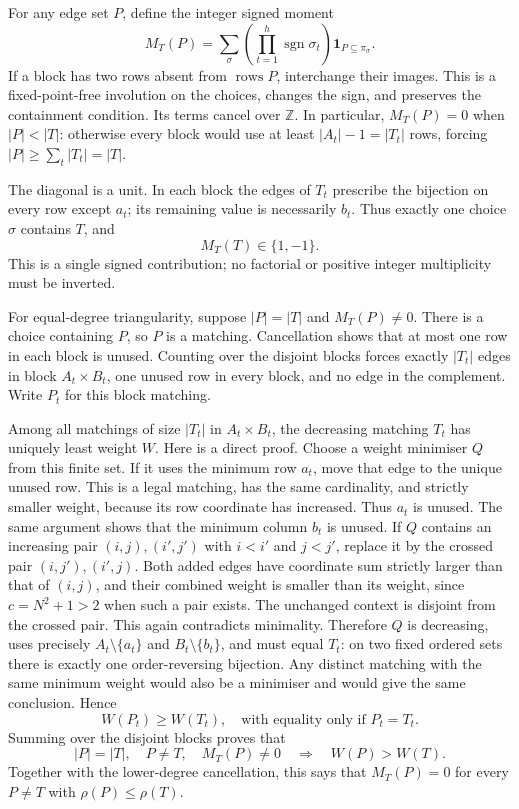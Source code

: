For any edge set $P$, define the integer signed moment
\[
 M_T(P)=\sum_{\sigma}
     \left(\prod_{t=1}^{h}\operatorname{sgn}\sigma_t\right)
     \boldsymbol{1}_{P\subseteq\pi_\sigma}.
\]
If a block has two rows absent from $\operatorname{rows}P$, interchange
their images.  This is a fixed-point-free involution on the choices,
changes the sign, and preserves the containment condition.  Its terms
cancel over $\mathbb Z$.  In particular, $M_T(P)=0$ when $|P|<|T|$:
otherwise every block would use at least $|A_t|-1=|T_t|$ rows, forcing
$|P|\geq\sum_t|T_t|=|T|$.

The diagonal is a unit.  In each block the edges of $T_t$ prescribe the
bijection on every row except $a_t$; its remaining value is necessarily
$b_t$.  Thus exactly one choice $\sigma$ contains $T$, and
\[
 M_T(T)\in\{1,-1\}.
\]
This is a single signed contribution; no factorial or positive integer
multiplicity must be inverted.

For equal-degree triangularity, suppose $|P|=|T|$ and $M_T(P)\ne0$.
There is a choice containing $P$, so $P$ is a matching.  Cancellation
shows that at most one row in each block is unused.  Counting over the
disjoint blocks forces exactly $|T_t|$ edges in block $A_t\times B_t$,
one unused row in every block, and no edge in the complement.  Write
$P_t$ for this block matching.

Among all matchings of size $|T_t|$ in $A_t\times B_t$, the decreasing
matching $T_t$ has uniquely least weight $W$.  Here is a direct proof.
Choose a weight minimiser $Q$ from this finite set.  If it uses the
minimum row $a_t$, move that edge to the unique unused row.  This is a
legal matching, has the same cardinality, and strictly smaller weight,
because its row coordinate has increased.  Thus $a_t$ is unused.
The same argument shows that the minimum column $b_t$ is unused.
If $Q$ contains an increasing pair $(i,j),(i',j')$ with
$i<i'$ and $j<j'$, replace it by the crossed pair
$(i,j'),(i',j)$.  Both added edges have coordinate sum strictly larger
than that of $(i,j)$, and their combined weight is smaller than its
weight, since $c=N^2+1>2$ when such a pair exists.  The unchanged context
is disjoint from the crossed pair.  This again contradicts minimality.
Therefore $Q$ is decreasing, uses precisely $A_t\setminus\{a_t\}$
and $B_t\setminus\{b_t\}$, and must equal $T_t$: on two fixed ordered
sets there is exactly one order-reversing bijection.  Any distinct
matching with the same minimum weight would also be a minimiser and
would give the same conclusion.  Hence
\[
 W(P_t)\geq W(T_t),\quad\text{with equality only if }P_t=T_t.
\]
Summing over the disjoint blocks proves that
\[
 |P|=|T|,\quad P\ne T,\quad M_T(P)\ne0
 \quad\Longrightarrow\quad W(P)>W(T).
\]
Together with the lower-degree cancellation, this says that $M_T(P)=0$
for every $P\ne T$ with $\rho(P)\leq\rho(T)$.

